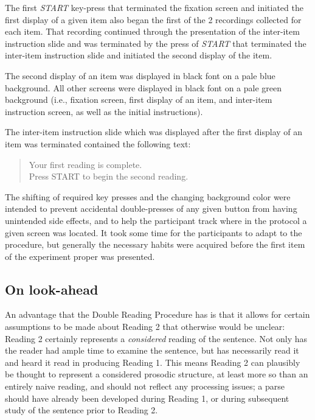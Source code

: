 \documentclass[12pt,oneside]{book}
\begin{document}
The first \emph{START} key-press that terminated the fixation screen and initiated the first display of a given item also began the first of the 2 recordings collected for each item. That recording continued through the presentation of the inter-item instruction slide and was terminated by the press of \emph{START} that terminated the inter-item instruction slide and initiated the second display of the item.

The second display of an item was displayed in black font on a pale blue background. All other screens were displayed in black font on a pale green background (i.e., fixation screen, first display of an item, and inter-item instruction screen, as well as the initial instructions).

The inter-item instruction slide which was displayed after the first display of an item was terminated contained the following text:

\begin{quotation}
Your first reading is complete.\\
Press START to begin the second reading.
\end{quotation}

The shifting of required key presses and the changing background color were intended to prevent accidental double-presses of any given button from having unintended side effects, and to help the participant track where in the protocol a given screen was located. It took some time for the participants to adapt to the procedure, but generally the necessary habits were acquired before the first item of the experiment proper was presented.

\hypertarget{look-ahead}{%
\subsection{On look-ahead}\label{look-ahead}}

An advantage that the Double Reading Procedure has is that it allows for certain assumptions to be made about Reading 2 that otherwise would be unclear: Reading 2 certainly represents a \emph{considered} reading of the sentence. Not only has the reader had ample time to examine the sentence, but has necessarily read it and heard it read in producing Reading 1. This means Reading 2 can plausibly be thought to represent a considered prosodic structure, at least more so than an entirely naive reading, and should not reflect any processing issues; a parse should have already been developed during Reading 1, or during subsequent study of the sentence prior to Reading 2.
\end{document}
